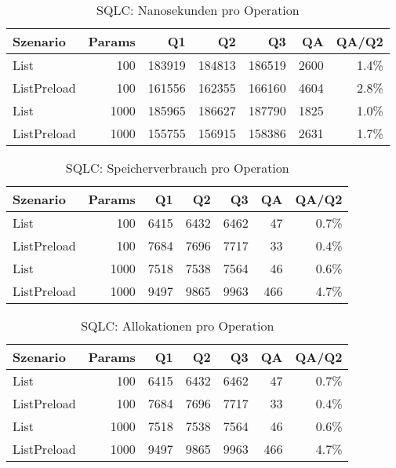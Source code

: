 
\begin{table}[ht]
\caption{SQLC: Nanosekunden pro Operation}
\begin{tabular}{lrrrrrr}
\toprule
Szenario & Params & Q1 & Q2 & Q3 & QA & QA/Q2 \\
\midrule
	List & 100 & 183919 & 184813 & 186519 & 2600 & 1.4\% \\
	ListPreload & 100 & 161556 & 162355 & 166160 & 4604 & 2.8\% \\
	List & 1000 & 185965 & 186627 & 187790 & 1825 & 1.0\% \\
	ListPreload & 1000 & 155755 & 156915 & 158386 & 2631 & 1.7\% \\
\bottomrule
\end{tabular}
\label{tab:benchmark_sqlc_nsperop}
\end{table}
	
\begin{table}[ht]
\caption{SQLC: Speicherverbrauch pro Operation}
\begin{tabular}{lrrrrrr}
\toprule
Szenario & Params & Q1 & Q2 & Q3 & QA & QA/Q2 \\
\midrule
	List & 100 & 6415 & 6432 & 6462 & 47 & 0.7\% \\
	ListPreload & 100 & 7684 & 7696 & 7717 & 33 & 0.4\% \\
	List & 1000 & 7518 & 7538 & 7564 & 46 & 0.6\% \\
	ListPreload & 1000 & 9497 & 9865 & 9963 & 466 & 4.7\% \\
\bottomrule
\end{tabular}
\label{tab:benchmark_sqlc_bytesperop}
\end{table}
	
\begin{table}[ht]
\caption{SQLC: Allokationen pro Operation}
\begin{tabular}{lrrrrrr}
\toprule
Szenario & Params & Q1 & Q2 & Q3 & QA & QA/Q2 \\
\midrule
	List & 100 & 6415 & 6432 & 6462 & 47 & 0.7\% \\
	ListPreload & 100 & 7684 & 7696 & 7717 & 33 & 0.4\% \\
	List & 1000 & 7518 & 7538 & 7564 & 46 & 0.6\% \\
	ListPreload & 1000 & 9497 & 9865 & 9963 & 466 & 4.7\% \\
\bottomrule
\end{tabular}
\label{tab:benchmark_sqlc_allocsperop}
\end{table}
	